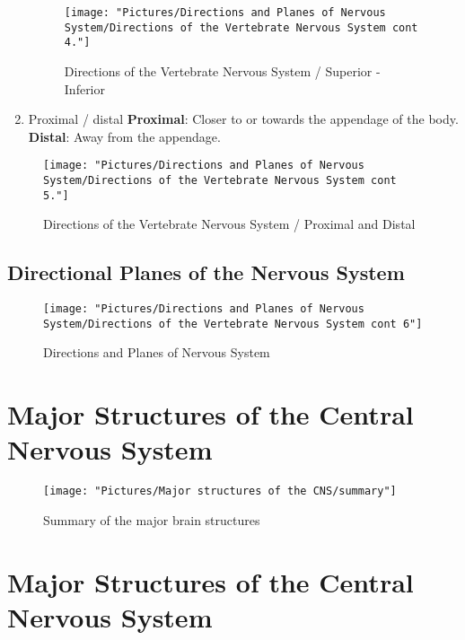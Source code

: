 \documentclass[12pt,a4paper]{article}
\begin{document}
\begin{enumerate}
\begin{figure}
	\centering
	\texttt{[image: "Pictures/Directions and Planes of Nervous System/Directions of the Vertebrate Nervous System cont 4."]}
	\caption{Directions of the Vertebrate Nervous System / Superior - Inferior}
	\label{fig:directions-of-the-vertebrate-nervous-system-cont-4}
\end{figure}
		
		
		\item Proximal / distal 
		\subitem \textbf{Proximal}: Closer to or towards the appendage of the body. 
		\subitem \textbf{Distal}: Away from the appendage. 
	\end{enumerate}
	
	
\begin{figure}
	\centering
	\texttt{[image: "Pictures/Directions and Planes of Nervous System/Directions of the Vertebrate Nervous System cont 5."]}
	\caption{Directions of the Vertebrate Nervous System / Proximal and Distal}
	\label{fig:directions-of-the-vertebrate-nervous-system-cont-5}
\end{figure}
	
	\subsection{Directional Planes of the Nervous System}
	
	
\begin{figure}
	\centering
	\texttt{[image: "Pictures/Directions and Planes of Nervous System/Directions of the Vertebrate Nervous System cont 6"]}
	\caption{Directions and Planes of Nervous System}
	\label{fig:directions-of-the-vertebrate-nervous-system-cont-6}
\end{figure}
	
	
	\section*{Major Structures of the Central Nervous System}
	
\begin{figure}
	\centering
	\texttt{[image: "Pictures/Major structures of the CNS/summary"]}
	\caption{Summary of the major brain structures}
	\label{fig:summary}
\end{figure}
	
	
	\section{Major Structures of the Central Nervous System}
	
\end{document}

